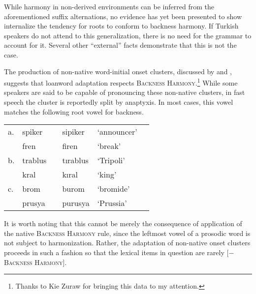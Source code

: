 While harmony in non-derived environments can be inferred from the aforementioned suffix alternations, no evidence has yet been presented to show internalize the tendency for roots to conform to backness harmony. If Turkish speakers do not attend to this generalization, there is no need for the grammar to account for it. Several other ``external'' facts demonstrate that this is not the case. 

The production of non-native word-initial onset clusters, discussed by \citet{Clements1982} and \citet{Kaun1999}, suggests that loanword adaptation respects \textsc{Backness Harmony}.\footnote{Thanks to Kie Zuraw for bringing this data to my attention.} While some speakers are said to be capable of pronouncing these non-native clusters, in fast speech the cluster is reportedly split by anaptyxis. In most cases, this vowel matches the following root vowel for backness.

\begin{example} 
\begin{tabular}{l l l l l l}
a. & {spiker}  & \alt{} & {sipiker}  & `announcer' \\
   & {fren}    & \alt{} & {firen}    & `break'     \\
b. & {trablus} & \alt{} & {tırablus} & `Tripoli'   \\
   & {kral}    & \alt{} & {kıral}    & `king'      \\
c. & {brom}    & \alt{} & {burom}    & `bromide'   \\
   & {prusya}  & \alt{} & {purusya}  & `Prussia'   \\
\end{tabular}
\end{example}

\noindent
It is worth noting that this cannot be merely the consequence of application of the native \textsc{Backness Harmony} rule, since the leftmost vowel of a prosodic word is not subject to harmonization. Rather, the adaptation of non-native onset clusters proceeds in such a fashion so that the lexical items in question are rarely [$-$\textsc{Backness Harmony}].

